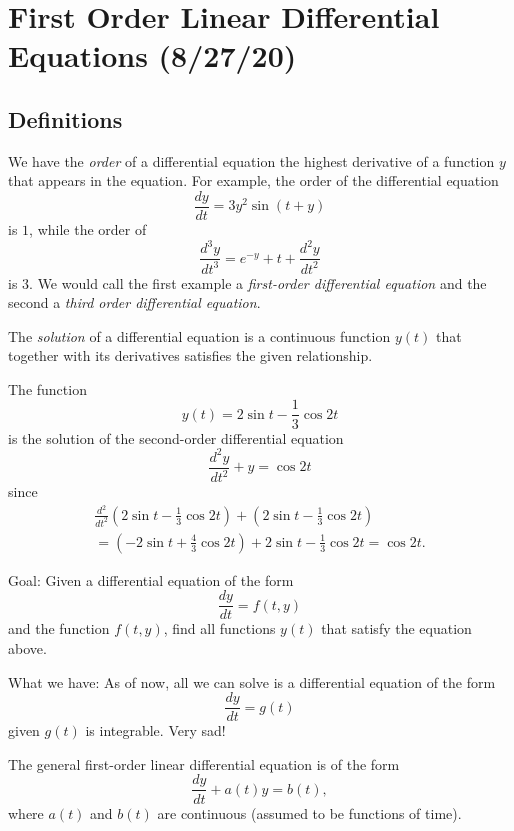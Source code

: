 \section{First Order Linear Differential Equations (8/27/20)}
\subsection{Definitions}
\begin{definition}[Order]
    We have the \emph{order} of a differential equation the highest derivative of a function $y$ that appears in the equation. For example, the order of the differential equation \[
        \frac{dy}{dt}=3y^2\sin(t+y)
    \]
    is $1$, while the order of \[
    \frac{d^3y}{dt^3}=e^{-y}+t+\frac{d^2y}{dt^2}
    \]
    is $3$. We would call the first example a \emph{first-order differential equation} and the second a \emph{third order differential equation}.
\end{definition}
\begin{definition}[Solution]
    The \emph{solution} of a differential equation is a continuous function $y(t)$ that together with its derivatives satisfies the given relationship.
\end{definition}
\begin{example}
    The function \[
        y(t)=2\sin t - \frac{1}{3}\cos 2t
    \]
    is the solution of the second-order differential equation \[
        \frac{d^2y}{dt^2}+y= \cos 2t
    \]
    since 
    \begin{align*}
        \frac{d^2}{dt^2}\left( 2\sin t - \frac{1}{3}\cos 2t \right) + \left( 2\sin t - \frac{1}{3}\cos 2t \right) \\
        = \left( -2\sin t + \frac{4}{3} \cos 2t \right) + 2 \sin t - \frac{1}{3}\cos 2t = \cos 2t.
    \end{align*}
\end{example}

Goal: Given a differential equation of the form \[
    \frac{dy}{dt}=f(t,y)
\]
and the function $f(t,y)$, find all functions $y(t)$ that satisfy the equation above.

What we have: As of now, all we can solve is a differential equation of the form \[
    \frac{dy}{dt}=g(t)
\]
given $g(t)$ is integrable. Very sad!
\begin{definition}
    The general first-order linear differential equation is of the form \[
        \frac{dy}{dt}+a(t)y=b(t),
    \]
    where $a(t)$ and $b(t)$ are continuous (assumed to be functions of time).
\end{definition}

